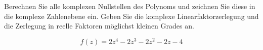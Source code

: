 \begin{ExerciseBlock}
Berechnen Sie alle komplexen Nullstellen des Polynoms und zeichnen Sie diese in die komplexe Zahlenebene ein. Geben Sie die komplexe Linearfaktorzerlegung und die Zerlegung in reelle Faktoren möglichst kleinen Grades an.

\begin{equation*}
	f(z) = 2z^4 - 2z^3 - 2z^2 - 2z - 4
\end{equation*}

\end{ExerciseBlock}
